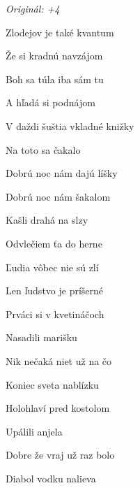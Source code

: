 \begin{song}


\begin{headerbox}
\textit{Originál: +4}
\end{headerbox}

\begin{hchordbox}
\end{hchordbox}

\Large

\bigskip

\Intro {}     \par

\bigskip

Zlodejov je také kvantum \par
Že si kradnú navzájom \par
{}Boh sa túla iba sám tu \par
A hľadá si podnájom \par

\bigskip

V daždi šuštia vkladné knižky \par
Na toto sa čakalo \par
{}Dobrú noc nám dajú líšky \par
Dobrú noc nám šakalom \par

\bigskip

\begin{chorusbox}{\Refren}
Kašli drahá na slzy \par
Odvlečiem ťa do herne \par
Ľudia vôbec nie sú zlí \par
Len ľudstvo je príšerné \par
\end{chorusbox}

\bigskip

Prváci si v kvetináčoch \par
Nasadili marišku \par
{}Nik nečaká niet už na čo \par
Koniec sveta nablízku \par

\bigskip

Holohlaví pred kostolom \par
Upálili anjela \par
{}Dobre že vraj už raz bolo \par
Diabol vodku nalieva \par

\bigskip

\Refren {} \par

\bigskip


\end{song}
